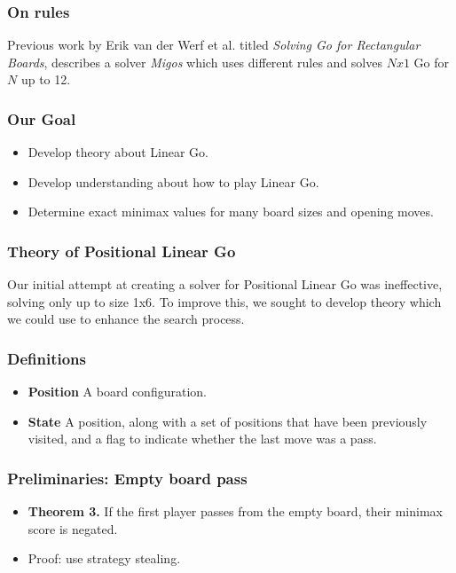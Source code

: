 \documentclass{beamer}
\begin{document}
    \begin{frame}
        \frametitle{On rules}
        Previous work by Erik van der Werf et al. titled \textit{Solving Go for Rectangular Boards},
        describes a solver \textit{Migos} which uses different rules
        and solves $Nx1$ Go for $N$ up to 12.
    \end{frame}

    \begin{frame}
        \frametitle{Our Goal}
        \begin{itemize}[<+->]
            \item Develop theory about Linear Go.
            \item Develop understanding about how to play Linear Go.
            \item Determine exact minimax values for many board sizes and opening moves.
        \end{itemize}
    \end{frame}

    \begin{frame}
        \frametitle{Theory of Positional Linear Go}
        Our initial attempt at creating a solver for Positional Linear Go was ineffective, solving only
        up to size 1x6. To improve this, we sought to develop theory which we could use to enhance the
        search process.
    \end{frame}

    \begin{frame}
        \frametitle{Definitions}
        \begin{itemize}
            \item \textbf{Position} A board configuration.
            \item \textbf{State} A position, along with a set of positions that have been previously visited, and a flag to indicate whether the last move was a pass.
        \end{itemize}
    \end{frame}

    \begin{frame}
        \frametitle{Preliminaries: Empty board pass}
        \begin{itemize}
            \item \textbf{Theorem 3.} If the first player passes from the empty board, their minimax score is negated.
            \item Proof: use strategy stealing.
        \end{itemize}
    \end{frame}
\end{document}
